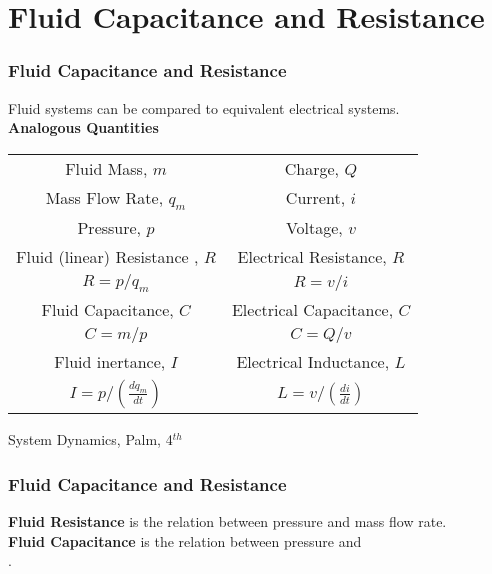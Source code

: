 \documentclass{beamer}                  %
\newcommand{\sectiontitleIII}{Fluid Capacitance and Resistance}
\begin{document}
\section{\sectiontitleIII}

	\begin{frame}[label=sectionIII] \small
		\frametitle{\sectiontitleIII}	
		\bigskip

		Fluid systems can be compared to equivalent electrical systems. \vspace{3mm}\\ 

		{\bf Analogous Quantities} \vspace{3mm}\\ 
		\begin{tabular}{|c|c|}
			Fluid Mass, $m$ & Charge, $Q$ \\
			Mass Flow Rate, $q_m$ & Current, $i$ \\	
			Pressure, $p$ & Voltage, $v$ \\
			Fluid (linear) Resistance , $R$ & Electrical Resistance, $R$ \\
			$R=p/q_m$ & $R=v/i$ \\
			Fluid Capacitance, $C$ & Electrical Capacitance, $C$ \\
			$C=m/p$ & $ C=Q/v$ \\
			Fluid inertance, $I$ & Electrical Inductance, $L$ \\
			$I=p/\left( \frac{dq_m}{dt}\right)$ & $L=v/\left( \frac{di}{dt}\right)$ \\

		\end{tabular}

		\btVFill
		\tiny{System Dynamics, Palm, 4$^{th}$}	
	\end{frame}	
	
	\begin{frame} \small
		\frametitle{\sectiontitleIII}
		\bigskip

		{\bf Fluid Resistance} is the relation between pressure and mass flow rate. \vspace{15mm}\\

		{\bf Fluid Capacitance} is the relation between pressure and \vspace{3mm}\\ 
		\underline{\hspace{20mm}} \hspace{2mm} \underline{\hspace{20mm}}.


		\btVFill
	\end{frame}	
\end{document}
